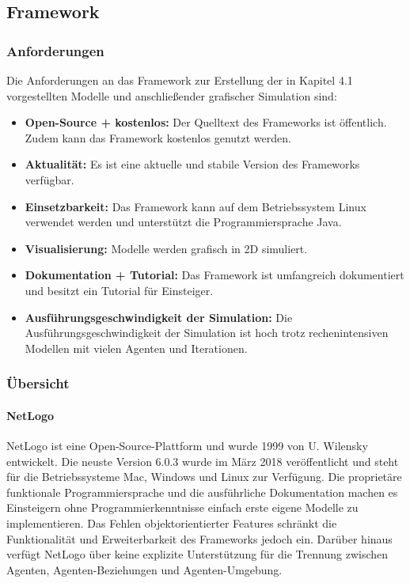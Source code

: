 \documentclass[a4paper, 11pt]{article}
\begin{document}
\subsection{Framework}
\subsubsection{Anforderungen}
Die Anforderungen an das Framework zur Erstellung der in Kapitel 4.1 vorgestellten Modelle und anschließender grafischer Simulation sind:
\begin{itemize}
	\item \textbf{Open-Source + kostenlos:} Der Quelltext des Frameworks ist öffentlich. Zudem kann das Framework kostenlos genutzt werden.
	\item \textbf{Aktualität:} Es ist eine aktuelle und stabile Version des Frameworks verfügbar. 
	\item \textbf{Einsetzbarkeit:} Das Framework kann auf dem Betriebssystem Linux verwendet werden und unterstützt die Programmiersprache Java.
	\item \textbf{Visualisierung:} Modelle werden grafisch in 2D simuliert.
	\item \textbf{Dokumentation + Tutorial:} Das Framework ist umfangreich dokumentiert und besitzt ein Tutorial für Einsteiger.
	\item \textbf{Ausführungsgeschwindigkeit der Simulation:} Die Ausführungsgeschwindigkeit der Simulation ist hoch trotz rechenintensiven Modellen mit vielen Agenten und Iterationen.
\end{itemize}
\subsubsection{Übersicht}
\paragraph{NetLogo}
NetLogo ist eine Open-Source-Plattform und wurde 1999 von U. Wilensky entwickelt. Die neuste Version 6.0.3 wurde im März 2018 veröffentlicht und steht für die Betriebssysteme Mac, Windows und Linux zur Verfügung. Die proprietäre funktionale Programmiersprache und die ausführliche Dokumentation machen es Einsteigern ohne Programmierkenntnisse einfach erste eigene Modelle zu implementieren. Das Fehlen objektorientierter Features schränkt die Funktionalität und Erweiterbarkeit des Frameworks jedoch ein. Darüber hinaus verfügt NetLogo über keine explizite Unterstützung für die Trennung zwischen Agenten, Agenten-Beziehungen und Agenten-Umgebung.
\end{document}

